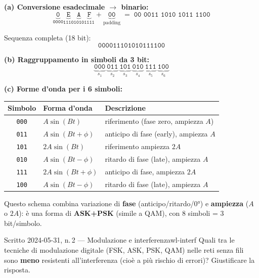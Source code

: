 \documentclass{report}
\begin{document}
\begin{solution}
\textbf{(a) Conversione esadecimale $\to$ binario:}
\[
  \underbrace{\texttt{0}}_{\texttt{0000}}
  \underbrace{\texttt{E}}_{\texttt{1110}}
  \underbrace{\texttt{A}}_{\texttt{1010}}
  \underbrace{\texttt{F}}_{\texttt{1111}}
  +\underbrace{\texttt{00}}_{\text{padding}}
  \;=\;
  \texttt{00 0011 1010 1011 1100}
\]

Sequenza completa (18 bit):
\[
  \texttt{000011101010111100}
\]

\medskip
\textbf{(b) Raggruppamento in simboli da 3 bit:}
\[
  \underbrace{\texttt{000}}_{s_1}\ \underbrace{\texttt{011}}_{s_2}\ \underbrace{\texttt{101}}_{s_3}\ \underbrace{\texttt{010}}_{s_4}\ \underbrace{\texttt{111}}_{s_5}\ \underbrace{\texttt{100}}_{s_6}
\]

\medskip
\textbf{(c) Forme d'onda per i 6 simboli:}
\begin{center}
\begin{tabular}{cll}
\hline
Simbolo & Forma d'onda & Descrizione \\
\hline
\texttt{000} & $A\sin(Bt)$         & riferimento (fase zero, ampiezza $A$) \\
\texttt{011} & $A\sin(Bt+\phi)$    & anticipo di fase (early), ampiezza $A$ \\
\texttt{101} & $2A\sin(Bt)$        & riferimento ampiezza $2A$ \\
\texttt{010} & $A\sin(Bt-\phi)$    & ritardo di fase (late), ampiezza $A$ \\
\texttt{111} & $2A\sin(Bt+\phi)$   & anticipo di fase, ampiezza $2A$ \\
\texttt{100} & $A\sin(Bt-\phi)$    & ritardo di fase (late), ampiezza $A$ \\
\hline
\end{tabular}
\end{center}

Questo schema combina variazione di \textbf{fase} (anticipo/ritardo/$0°$) e
\textbf{ampiezza} ($A$ o $2A$): è una forma di \textbf{ASK+PSK} (simile a QAM),
con 8 simboli = 3 bit/simbolo.
\end{solution}

\begin{Exercise}{Scritto 2024-05-31, n.\,2 --- Modulazione e interferenza}{wl-interf}
Quali tra le tecniche di modulazione digitale (FSK, ASK, PSK, QAM) nelle reti
senza fili sono \textbf{meno} resistenti all'interferenza (cioè a più rischio di
errori)? Giustificare la risposta.
\end{Exercise}
\end{document}
